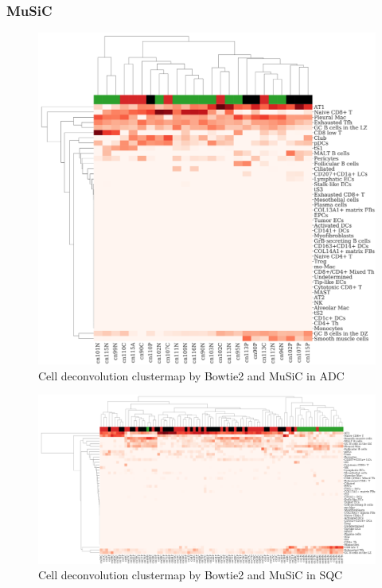 \documentclass[11pt,a4paper,onecolumn,oneside]{report}
\begin{document}
            \subsubsection{MuSiC}
                \begin{figure}[p]
                    \centering
                    \includegraphics[width=0.6 \linewidth]{figures/MuSiC/clustermap/Bowtie2.ADC.cluster.pdf}
                    \caption{Cell deconvolution clustermap by Bowtie2 and MuSiC in ADC}
                    \label{fig:Deconvolution-MuSiC-Bowtie2-cluster-ADC}
                \end{figure}

                \begin{figure}[p]
                    \centering
                    \includegraphics[width=\linewidth]{figures/MuSiC/clustermap/Bowtie2.SQC.cluster.pdf}
                    \caption{Cell deconvolution clustermap by Bowtie2 and MuSiC in SQC}
                    \label{fig:Deconvolution-MuSiC-Bowtie2-cluster-SQC}
                \end{figure}
\end{document}
